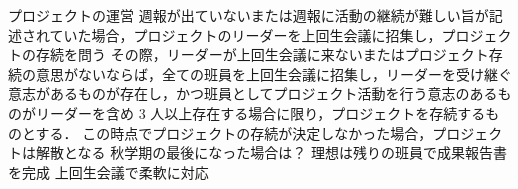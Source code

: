 プロジェクトの運営
    週報が出ていないまたは週報に活動の継続が難しい旨が記述されていた場合，プロジェクトのリーダーを上回生会議に招集し，プロジェクトの存続を問う
    その際，リーダーが上回生会議に来ないまたはプロジェクト存続の意思がないならば，全ての班員を上回生会議に招集し，リーダーを受け継ぐ意志があるものが存在し，かつ班員としてプロジェクト活動を行う意志のあるものがリーダーを含め 3 人以上存在する場合に限り，プロジェクトを存続するものとする．
    この時点でプロジェクトの存続が決定しなかった場合，プロジェクトは解散となる
    秋学期の最後になった場合は？
        理想は残りの班員で成果報告書を完成
        上回生会議で柔軟に対応
        
    
